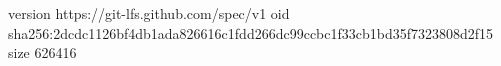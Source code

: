 version https://git-lfs.github.com/spec/v1
oid sha256:2dcdc1126bf4db1ada826616c1fdd266dc99ccbc1f33cb1bd35f7323808d2f15
size 626416
